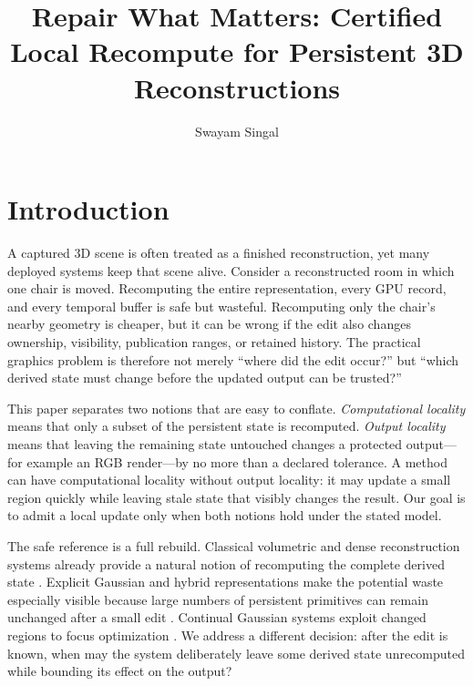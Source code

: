 \documentclass[acmtog,nonacm]{acmart}
\title{Repair What Matters: Certified Local Recompute for Persistent 3D Reconstructions}
\author{Swayam Singal}
\begin{document}
\maketitle
\thispagestyle{plain}
\pagestyle{plain}
\raggedbottom

\section{Introduction}
A captured 3D scene is often treated as a finished reconstruction, yet many deployed systems keep that scene alive. Consider a reconstructed room in which one chair is moved. Recomputing the entire representation, every GPU record, and every temporal buffer is safe but wasteful. Recomputing only the chair's nearby geometry is cheaper, but it can be wrong if the edit also changes ownership, visibility, publication ranges, or retained history. The practical graphics problem is therefore not merely ``where did the edit occur?'' but ``which derived state must change before the updated output can be trusted?''

This paper separates two notions that are easy to conflate. \emph{Computational locality} means that only a subset of the persistent state is recomputed. \emph{Output locality} means that leaving the remaining state untouched changes a protected output---for example an RGB render---by no more than a declared tolerance. A method can have computational locality without output locality: it may update a small region quickly while leaving stale state that visibly changes the result. Our goal is to admit a local update only when both notions hold under the stated model.

The safe reference is a full rebuild. Classical volumetric and dense reconstruction systems already provide a natural notion of recomputing the complete derived state \citep{curless1996volumetric,newcombe2011kinectfusion,dai2017bundlefusion}. Explicit Gaussian and hybrid representations make the potential waste especially visible because large numbers of persistent primitives can remain unchanged after a small edit \citep{kerbl2023gaussians,keetha2024splatam,matsuki2024monogs}. Continual Gaussian systems exploit changed regions to focus optimization \citep{ackermann2025clsplats,zeng2025gaussianupdate,yugay2026game}. We address a different decision: after the edit is known, when may the system deliberately leave some derived state unrecomputed while bounding its effect on the output?
\end{document}
